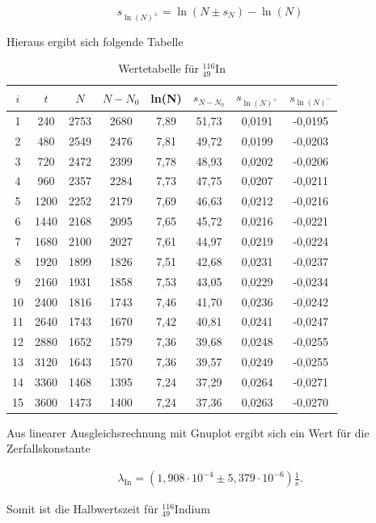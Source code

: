 \begin{equation}
 s_{\ln(N)^{\pm}} = \ln(N\pm s_N)-\ln(N)
\end{equation}

Hieraus ergibt sich folgende Tabelle

\renewcommand{\arraystretch}{1.25}
\begin{table}[h]
 \begin{tabular}{c|c|c|c|c|c|c|c}
 $i$ & $t$ & $N$ & $N-N_0$ & ln(N) & $s_{N-N_0}$ & $s_{\ln(N)^+}$ & $s_{\ln(N)^-}$ \\
 \hline
1&	240&	2753&	2680&	7,89&	51,73&	0,0191&	-0,0195\\
2&	480&	2549&	2476&	7,81&	49,72&	0,0199&	-0,0203\\
3&	720&	2472&	2399&	7,78&	48,93&	0,0202&	-0,0206\\
4&	960&	2357&	2284&	7,73&	47,75&	0,0207&	-0,0211\\
5&	1200&	2252&	2179&	7,69&	46,63&	0,0212&	-0,0216\\
6&	1440&	2168&	2095&	7,65&	45,72&	0,0216&	-0,0221\\
7&	1680&	2100&	2027&	7,61&	44,97&	0,0219&	-0,0224\\
8&	1920&	1899&	1826&	7,51&	42,68&	0,0231&	-0,0237\\
9&	2160&	1931&	1858&	7,53&	43,05&	0,0229&	-0,0234\\
10&	2400&	1816&	1743&	7,46&	41,70&	0,0236&	-0,0242\\
11&	2640&	1743&	1670&	7,42&	40,81&	0,0241&	-0,0247\\
12&	2880&	1652&	1579&	7,36&	39,68&	0,0248&	-0,0255\\
13&	3120&	1643&	1570&	7,36&	39,57&	0,0249&	-0,0255\\
14&	3360&	1468&	1395&	7,24&	37,29&	0,0264&	-0,0271\\
15&	3600&	1473&	1400&	7,24&	37,36&	0,0263&	-0,0270\\
\end{tabular}
\caption{Wertetabelle für $^{116}_{49}$In}
\end{table}
\renewcommand{\arraystretch}{1}

Aus linearer Ausgleichsrechnung mit Gnuplot ergibt sich ein Wert für die Zerfallskonstante 

\begin{align}
\lambda_{\text{In}} = (1,908 \cdot 10^{-4} \pm 5,379 \cdot 10^{-6}) \frac{1}{\text{s}}.
\end{align}

Somit ist die Halbwertszeit für $^{116}_{49}$Indium

